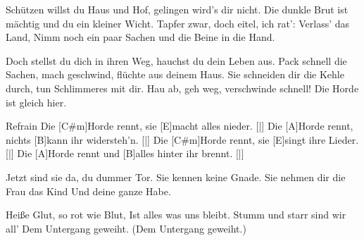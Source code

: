 \begin{guitar}
	
	Schützen willst du Haus und Hof, gelingen wird's dir nicht.
	Die dunkle Brut ist mächtig und du ein kleiner Wicht.
	Tapfer zwar, doch eitel, ich rat': Verlass' das Land,
	Nimm noch ein paar Sachen und die Beine in die Hand.
	
	Doch stellst du dich in ihren Weg, hauchst du dein Leben aus.
	Pack schnell die Sachen, mach geschwind, flüchte aus deinem Haus.
	Sie schneiden dir die Kehle durch, tun Schlimmeres mit dir.
	Hau ab, geh weg, verschwinde schnell! Die Horde ist gleich hier.%
  \pagebreak
  \begin{chorus}{Refrain}
	Die [C#m]Horde rennt, sie [E]macht alles nieder.		\hfill [|]{}
	Die [A]Horde rennt, nichts [B]kann ihr widersteh'n.		\hfill [|]{}
	Die [C#m]Horde rennt, sie [E]singt ihre Lieder.			\hfill [|]{}
	Die [A]Horde rennt und [B]alles hinter ihr brennt.		\hfill [|]{}%
  \end{chorus}
	
	
	Jetzt sind sie da, du dummer Tor.
	Sie kennen keine Gnade.
	Sie nehmen dir die Frau das Kind
	Und deine ganze Habe.
	
	Heiße Glut, so rot wie Blut,
	Ist alles was uns bleibt.
	Stumm und starr sind wir all'
	Dem Untergang geweiht. (Dem Untergang geweiht.)
	
	 
	
\end{guitar}
